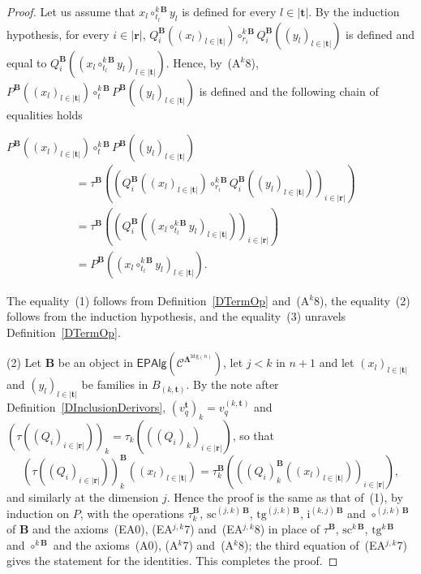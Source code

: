 \documentclass[a4paper, reqno]{amsbook}
\newcommand{\bb}[1]{\ensuremath{\lvert #1 \rvert}}
\newcommand{\sig}[1]{\mathbf{#1}}             %
\newcommand{\spec}[1]{\boldsymbol{\mathcal{#1}}} %
\newcommand{\htg}{\mathrm{htg}}                %
\newcommand{\src}{\mathrm{sc}}
\newcommand{\tgt}{\mathrm{tg}}
\theoremstyle{plain}
\theoremstyle{definition}
\begin{document}
\begin{proof}
Let us assume that $x_{l}\circ^{k\,\mathbf{B}}_{t_{l}}y_{l}$ is defined for every $l\in\bb{\mathbf{t}}$.
By the induction hypothesis, for every $i\in\bb{\mathbf{r}}$, $Q_{i}^{\mathbf{B}}((x_{l})_{l\in\bb{\mathbf{t}}})\circ^{k\,\mathbf{B}}_{r_{i}}Q_{i}^{\mathbf{B}}((y_{l})_{l\in\bb{\mathbf{t}}})$ is defined and equal to $Q_{i}^{\mathbf{B}}((x_{l}\circ^{k\,\mathbf{B}}_{t_{l}}y_{l})_{l\in\bb{\mathbf{t}}})$.
Hence, by~(A$^{k}$8), $P^{\mathbf{B}}((x_{l})_{l\in\bb{\mathbf{t}}})\circ^{k\,\mathbf{B}}_{t}P^{\mathbf{B}}((y_{l})_{l\in\bb{\mathbf{t}}})$ is defined and the following chain of equalities holds
\begin{flushleft}
$
P^{\mathbf{B}}\left((x_{l})_{l\in\bb{\mathbf{t}}}\right)\circ^{k\,\mathbf{B}}_{t}P^{\mathbf{B}}\left((y_{l})_{l\in\bb{\mathbf{t}}}\right)
$
\begin{align*}
&=
\tau^{\mathbf{B}}\left(\left(Q_{i}^{\mathbf{B}}\left((x_{l})_{l\in\bb{\mathbf{t}}}\right)\circ^{k\,\mathbf{B}}_{r_{i}}Q_{i}^{\mathbf{B}}\left((y_{l})_{l\in\bb{\mathbf{t}}}\right)\right)_{i\in\bb{\mathbf{r}}}\right)
\tag{1}
\\&=
\tau^{\mathbf{B}}\left(\left(Q_{i}^{\mathbf{B}}\left(\left(x_{l}\circ^{k\,\mathbf{B}}_{t_{l}}y_{l}\right)_{l\in\bb{\mathbf{t}}}\right)\right)_{i\in\bb{\mathbf{r}}}\right)
\tag{2}
\\&=
P^{\mathbf{B}}\left(\left(x_{l}\circ^{k\,\mathbf{B}}_{t_{l}}y_{l}\right)_{l\in\bb{\mathbf{t}}}\right).
\tag{3}
\end{align*}
\end{flushleft}
The equality~(1) follows from Definition~\ref{DTermOp} and~(A$^{k}$8), the equality~(2) follows from the induction hypothesis, and the equality~(3) unravels Definition~\ref{DTermOp}.

(2) Let $\mathbf{B}$ be an object in $\mathsf{EPAlg}(\spec{C}^{\sig{\Lambda}^{\htg(n)}})$, let $j<k$ in $n+1$ and let $(x_{l})_{l\in\bb{\mathbf{t}}}$ and $(y_{l})_{l\in\bb{\mathbf{t}}}$ be families in $B_{(k,\mathbf{t})}$.
By the note after Definition~\ref{DInclusionDerivors}, $(v^{\mathbf{t}}_{q})_{k}=v^{(k,\mathbf{t})}_{q}$ and $(\tau((Q_{i})_{i\in\bb{\mathbf{r}}}))_{k}=\tau_{k}(((Q_{i})_{k})_{i\in\bb{\mathbf{r}}})$, so that
$$
\left(\tau\left((Q_{i})_{i\in\bb{\mathbf{r}}}\right)\right)_{k}^{\mathbf{B}}\left((x_{l})_{l\in\bb{\mathbf{t}}}\right)=\tau^{\mathbf{B}}_{k}\left(\left((Q_{i})_{k}^{\mathbf{B}}\left((x_{l})_{l\in\bb{\mathbf{t}}}\right)\right)_{i\in\bb{\mathbf{r}}}\right),
$$
and similarly at the dimension $j$.
Hence the proof is the same as that of~(1), by induction on $P$, with the operations $\tau^{\mathbf{B}}_{k}$, $\src^{(j,k)\,\mathbf{B}}$, $\tgt^{(j,k)\,\mathbf{B}}$, $\mathrm{i}^{(k,j)\,\mathbf{B}}$ and $\circ^{(j,k)\,\mathbf{B}}$ of $\mathbf{B}$ and the axioms~(EA0), (EA$^{j,k}$7) and~(EA$^{j,k}$8) in place of $\tau^{\mathbf{B}}$, $\src^{k\,\mathbf{B}}$, $\tgt^{k\,\mathbf{B}}$ and $\circ^{k\,\mathbf{B}}$ and the axioms~(A0), (A$^{k}$7) and~(A$^{k}$8); the third equation of~(EA$^{j,k}$7) gives the statement for the identities. This completes the proof.
\end{proof}
\end{document}
